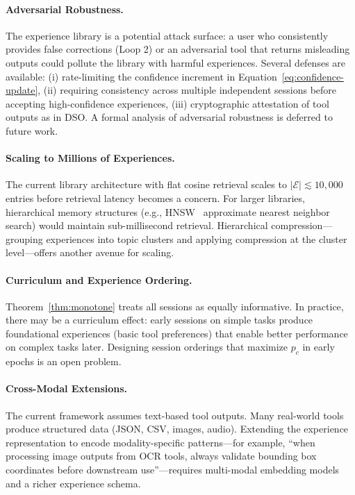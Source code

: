 \documentclass[11pt]{article}
\begin{document}
\paragraph{Adversarial Robustness.}
The experience library is a potential attack surface: a user who consistently
provides false corrections (Loop 2) or an adversarial tool that returns
misleading outputs could pollute the library with harmful experiences. Several
defenses are available: (i) rate-limiting the confidence increment in
Equation~\eqref{eq:confidence-update}, (ii) requiring consistency across
multiple independent sessions before accepting high-confidence experiences,
(iii) cryptographic attestation of tool outputs as in DSO. A formal analysis
of adversarial robustness is deferred to future work.

\paragraph{Scaling to Millions of Experiences.}
The current library architecture with flat cosine retrieval scales to
$|\mathcal{E}| \lesssim 10{,}000$ entries before retrieval latency becomes a
concern. For larger libraries, hierarchical memory structures (e.g.,
HNSW~\cite{malkov2018efficient} approximate nearest neighbor search) would
maintain sub-millisecond retrieval. Hierarchical compression---grouping
experiences into topic clusters and applying compression at the cluster
level---offers another avenue for scaling.

\paragraph{Curriculum and Experience Ordering.}
Theorem~\ref{thm:monotone} treats all sessions as equally informative. In
practice, there may be a curriculum effect: early sessions on simple tasks
produce foundational experiences (basic tool preferences) that enable better
performance on complex tasks later. Designing session orderings that maximize
$p_c$ in early epochs is an open problem.

\paragraph{Cross-Modal Extensions.}
The current framework assumes text-based tool outputs. Many real-world tools
produce structured data (JSON, CSV, images, audio). Extending the experience
representation to encode modality-specific patterns---for example, ``when
processing image outputs from OCR tools, always validate bounding box
coordinates before downstream use''---requires multi-modal embedding models
and a richer experience schema.
\end{document}
